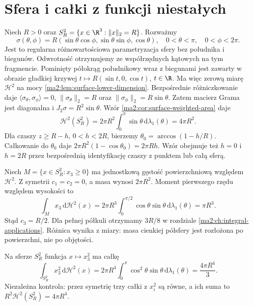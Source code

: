 \section{Sfera i całki z funkcji niestałych}

\begin{przyklad}
\label{ma2:ex:surface-sphere}
Niech $R>0$ oraz $S_R^2=\{x\in\R^3:\|x\|_2=R\}$.
Rozważmy
\[
 \sigma(\theta,\phi)=R(\sin\theta\cos\phi,
 \sin\theta\sin\phi,\cos\theta),
 \quad 0<\theta<\pi,\quad 0<\phi<2\pi.
\]
Jest to regularna różnowartościowa parametryzacja
sfery bez południka i biegunów. Odwrotność
otrzymujemy ze współrzędnych kątowych na tym
fragmencie. Pominięty półokrąg południkowy wraz z biegunami
jest zawarty w obrazie gładkiej krzywej
$t\mapsto R(\sin t,0,\cos t)$, $t\in\R$.
Ma więc zerową miarę $\mathcal H^2$ na mocy
\ref{ma2:lem:surface-lower-dimension}.
Bezpośrednie różniczkowanie daje
$\langle\sigma_\theta,\sigma_\phi\rangle=0$,
$\|\sigma_\theta\|_2=R$ oraz
$\|\sigma_\phi\|_2=R\sin\theta$.
Zatem macierz Grama jest diagonalna i
$J_2\sigma=R^2\sin\theta$.
Wzór \ref{ma2:cor:surface-weighted-area} daje
\[
 \mathcal H^2(S_R^2)
 =2\pi R^2\int_0^\pi\sin\theta\,\mathrm d\lambda_1(\theta)
 =4\pi R^2.
\]
Dla czaszy $z\ge R-h$, $0<h<2R$, bierzemy
$\theta_0=\arccos(1-h/R)$. Całkowanie do
$\theta_0$ daje $2\pi R^2(1-\cos\theta_0)=2\pi Rh$.
Wzór obejmuje też $h=0$ i $h=2R$ przez bezpośrednią
identyfikację czaszy z punktem lub całą sferą.
\end{przyklad}

\begin{przyklad}
\label{ma2:ex:surface-hemisphere-mass}
Niech $M=\{x\in S_R^2:x_3\ge0\}$ ma jednostkową
gęstość powierzchniową względem $\mathcal H^2$.
Z symetrii $c_1=c_2=0$, a masa wynosi $2\pi R^2$.
Moment pierwszego rzędu względem wysokości to
\[
 \int_M x_3\,\mathrm d\mathcal H^2(x)
 =2\pi R^3\int_0^{\pi/2}\cos\theta\sin\theta\,
 \mathrm d\lambda_1(\theta)=\pi R^3.
\]
Stąd $c_3=R/2$. Dla pełnej półkuli otrzymamy $3R/8$ w rozdziale
\ref{ma2:ch:integral-applications}.
Różnica wynika z miary: masa cienkiej półsfery
jest rozłożona po powierzchni, nie po objętości.
\end{przyklad}

\begin{przyklad}
\label{ma2:ex:surface-sphere-moment}
Na sferze $S_R^2$ funkcja $x\mapsto x_3^2$ ma całkę
\[
 \int_{S_R^2} x_3^2\,\mathrm d\mathcal H^2(x)
 =2\pi R^4\int_0^\pi\cos^2\theta\sin\theta\,
 \mathrm d\lambda_1(\theta)=\frac{4\pi R^4}{3}.
\]
Niezależna kontrola: przez symetrię trzy całki
z $x_i^2$ są równe, a ich suma to
$R^2\mathcal H^2(S_R^2)=4\pi R^4$.
\end{przyklad}

